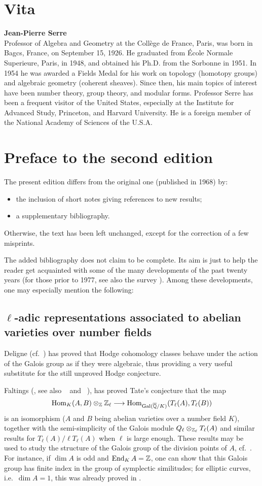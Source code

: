 \chapter*{Vita}
{\bfseries\large Jean-Pierre Serre}\\
Professor of Algebra and Geometry at the Collège de France, Paris, was born in
Bagcs, France, on September 15, 1926. He graduated from École Normale
Superieure, Paris, in 1948, and obtained his Ph.D. from the Sorbonne in 1951.
In 1954 he was awarded a Fields Medal for his work on topology (homotopy
groups) and algebraic geometry (coherent sheaves). Since then, his main topics
of interest have been number theory, group theory, and modular forms. Professor
Serre has been a frequent visitor of the United States, especially at the
Institute for Advanced Study, Princeton, and Harvard University. He is a
foreign member of the National Academy of Sciences of the U.S.A.

\chapter*{Preface to the second edition}
The present edition differs from the original one (published in 1968) by:
\begin{itemize}
	\item the inclusion of short notes giving references to new results;
	\item a supplementary bibliography.
\end{itemize}
Otherwise, the text has been left unchanged, except for the correction of a few
misprints.

The added bibliography does not claim to be complete. Its aim is just to help
the reader get acquainted with some of the many developments of the past twenty
years (for those prior to 1977, see also the survey \cite{78}). Among these
developments, one may especially mention the following:

\section*{\texorpdfstring{$\ell$}{ℓ}-adic representations associated to abelian
varieties over number fields}
Deligne (cf.\ \cite{52}) has proved that Hodge cohomology classes behave under
the action of the Galois group as if they were algebraic, thus providing a very
useful substitute for the still unproved Hodge conjecture.

Faltings (\cite{54}, see also \citeauthor{82}~\cite{82} and
\citeauthor{56}~\cite{56}), has proved Tate's conjecture that the map
\[
	\operatorname{Hom}_K(A, B) \otimes_{\mathbb{Z}} \mathbb{Z}_\ell \longrightarrow
	\operatorname{Hom}_{\operatorname{Gal}(\overline{\mathbb{Q}}/K)}(T_\ell(A), T_\ell(B))
\]
is an isomorphism ($A$ and $B$ being abelian varieties over a number field
$K$), together with the semi-simplicity of the Galois module $Q_\ell
\otimes_{\mathbb{Z}_\ell} T_\ell(A)$ and similar results for $T_\ell(A)/\ell T_\ell(A)$
when $\ell$ is large enough. These results may be used to study the structure
of the Galois group of the division points of $A$, cf.\ \cite{80}. For
instance, if $\dim A$ is odd and $\operatorname{End}_KA = \mathbb{Z}$, one can show that this Galois
group has finite index in the group of symplectic similitudes; for elliptic
curves, i.e.\ $\dim A = 1$, this was already proved in \cite{76}.

